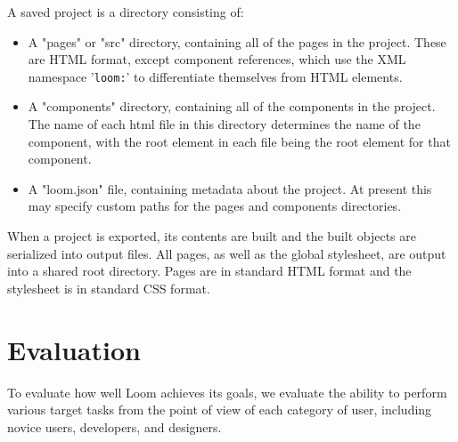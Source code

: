 \documentclass[conference, letterpaper]{IEEEtran}
\begin{document}
A saved project is a directory consisting of:
\begin{itemize}
  \item A "pages" or "src" directory, containing all of the pages in the project. These are HTML format, except component references, which use the XML namespace '\texttt{loom:}' to differentiate themselves from HTML elements.
  \item A "components" directory, containing all of the components in the project. The name of each html file in this directory determines the name of the component, with the root element in each file being the root element for that component.
  \item A "loom.json" file, containing metadata about the project. At present this may specify custom paths for the pages and components directories.
\end{itemize}

When a project is exported, its contents are built and the built objects are serialized into output files. All pages, as well as the global stylesheet, are output into a shared root directory. Pages are in standard HTML format and the stylesheet is in standard CSS format.

\section{Evaluation}
To evaluate how well Loom achieves its goals, we evaluate the ability to perform various target tasks from the point of view of each category of user, including novice users, developers, and designers.
\end{document}
